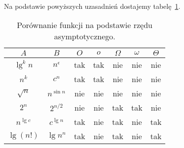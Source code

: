\bigskip
\noindent Na podstawie powyższych uzasadnień dostajemy tabelę~\ref{tab:3-2}.
\begin{table}[ht]
	\begin{center}
		\begin{tabular}{cc|c|c|c|c|c}
			$A$ & $B$ & $O$ & $o$ & $\Omega$ & $\omega$ & $\Theta$ \\
			\hline
			$\lg^kn$ & $n^\epsilon$ & tak & tak & nie & nie & nie \\
			\hline
			$n^k$ & $c^n$ & tak & tak & nie & nie & nie \\
			\hline
			$\sqrt{n}$ & $n^{\sin n}$ & nie & nie & nie & nie & nie \\
			\hline
			$2^n$ & $2^{n/2}$ & nie & nie & tak & tak & nie \\
			\hline
			$n^{\lg c}$ & $c^{\lg n}$ & tak & nie & tak & nie & tak \\
			\hline
			$\lg(n!)$ & $\lg n^n$ & tak & nie & tak & nie & tak
		\end{tabular}
		\caption{Porównanie funkcji na podstawie rzędu asymptotycznego.} \label{tab:3-2}
	\end{center}
\end{table}



